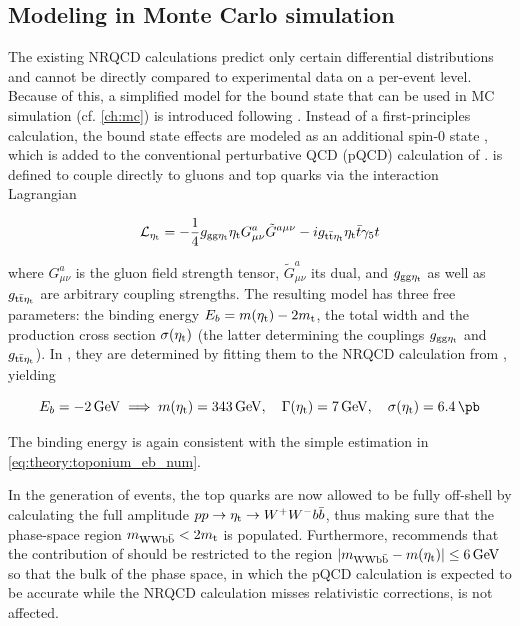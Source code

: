 \subsection{Modeling in Monte Carlo simulation}

The existing NRQCD calculations predict only certain differential distributions and cannot be directly compared to experimental data on a per-event level. Because of this, a simplified model for the \ttbar bound state that can be used in MC simulation (cf. \cref{ch:mc}) is introduced following . Instead of a first-principles calculation, the bound state effects are modeled as an additional spin-0 state \etat, which is added to the conventional perturbative QCD (pQCD) calculation of \ttbar. \etat is defined to couple directly to gluons and top quarks via the interaction Lagrangian~\cite{Maltoni:2024tul,Fuks:2021xje}

\begin{equation}
\label{eq:theory:etatlagrangian}
  \mathcal{L}_{\mathrm{\eta_t}} = - \frac{1}{4} g_{\mathrm{gg} \mathrm{\eta_t}} \mathrm{\eta_t} G^{a}_{\mu \nu} \tilde{G}^{a \mu \nu} - i g_{\mathrm{t \bar{t}} \mathrm{\eta_t}} \mathrm{\eta_t} \bar{t} \gamma_5 t
\end{equation}

\noindent where $G^{a}_{\mu \nu}$ is the gluon field strength tensor, $\tilde{G}^{a}_{\mu \nu}$ its dual, and $g_{\mathrm{gg} \mathrm{\eta_t}}$ as well as $g_{\mathrm{t \bar{t}} \mathrm{\eta_t}}$ are arbitrary coupling strengths. The resulting model has three free parameters: the binding energy $E_b = m(\mathrm{\eta_t}) - 2 m_{\mathrm{t}}$, the total width \Gammaetat and the production cross section $\sigma(\mathrm{\eta_t})$ (the latter determining the couplings $g_{\mathrm{gg} \mathrm{\eta_t}}$ and $g_{\mathrm{t \bar{t}} \mathrm{\eta_t}}$). In , they are determined by fitting them to the NRQCD calculation from , yielding

\begin{equation}
  \label{eq:theory:etatparams_7gev}
  E_b = \SI{-2}{\GeV} \implies \metat = \SI{343}{\GeV}, \quad \Gammaetat = \SI{7}{\GeV}, \quad \sigma(\etat) = \SI{6.4}{\pb}
\end{equation}

The binding energy is again consistent with the simple estimation in \cref{eq:theory:toponium_eb_num}.

In the generation of events, the top quarks are now allowed to be fully off-shell by calculating the full amplitude $p p \rightarrow \mathrm{\eta_t} \rightarrow W^+ W^- b \bar{b}$, thus making sure that the phase-space region $m_{\mathrm{WWb\bar{b}}} < 2 m_{\mathrm{t}}$ is populated. Furthermore,  recommends that the contribution of \etat should be restricted to the region $|m_{\mathrm{WWb\bar{b}}} - m(\mathrm{\eta_t})| \leq \SI{6}{GeV}$ so that the bulk of the \ttbar phase space, in which the pQCD calculation is expected to be accurate while the NRQCD calculation misses relativistic corrections, is not affected.


